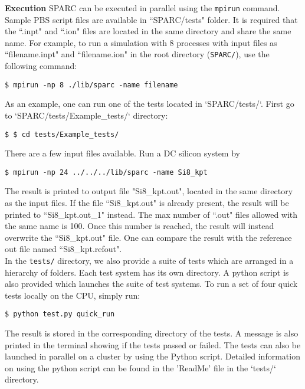\begin{frame}{\textbf{Execution}} \label{Execution}
SPARC can be executed in parallel using the \texttt{mpirun} command. Sample PBS script files are available in ``SPARC/tests" folder. It is required that the ``.inpt" and ``.ion" files are located in the same directory and share the same name. For example, to run a simulation with 8 processes with input files as ``filename.inpt" and ``filename.ion" in the root directory (\texttt{SPARC/}), use the following command:
\begin{verbatim}
$ mpirun -np 8 ./lib/sparc -name filename
\end{verbatim} 
As an example, one can run one of the tests located in `SPARC/tests/`. First go to `SPARC/tests/Example\_tests/` directory:
\begin{verbatim}
$ $ cd tests/Example_tests/
\end{verbatim} 
There are a few input files available. Run a DC silicon system by
\begin{verbatim}
$ mpirun -np 24 ../../../lib/sparc -name Si8_kpt
\end{verbatim} 

The result is printed to output file "Si8\_kpt.out", located in the same directory as the input files. If the file ``Si8\_kpt.out" is already present, the result will be printed to ``Si8\_kpt.out\_1" instead. The max number of ``.out" files allowed with the same name is 100. Once this number is reached, the result will instead overwrite the ``Si8\_kpt.out" file. One can compare the result with the reference out file named ``Si8\_kpt.refout".\\

\hspace{3mm} In the \texttt{tests/} directory, we also provide a suite of tests which are arranged in a hierarchy of folders. Each test system has its own directory. A python script is also provided which launches the suite of test systems. To run a set of four quick tests locally on the CPU, simply run: 
\begin{verbatim}
$ python test.py quick_run
\end{verbatim} 

The result is stored in the corresponding directory of the tests. A message is also printed in the terminal showing if the tests passed or failed. The tests can also be launched in parallel on a cluster by using the Python script. Detailed information on using the python script can be found in the 'ReadMe' file in the `tests/` directory.
\end{frame}


